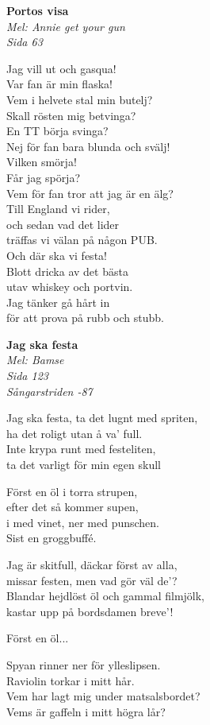 \documentclass[10pt]{article}
\newenvironment{song}[2]{
	\textbf{#1}\\
	\emph{#2}\par
	\vspace{-1mm}
}{
	\vspace{2mm}
}
\begin{document}
\begin{multicols*}{2}
\vfill
\columnbreak

\begin{song}{Portos visa}{Mel: Annie get your gun\\Sida 63}
	Jag vill ut och gasqua!\\
	Var fan är min flaska!\\
	Vem i helvete stal min butelj?\\
	Skall rösten mig betvinga?\\
	En TT börja svinga?\\
	Nej för fan bara blunda och svälj!\\
	Vilken smörja!\\
	Får jag spörja?\\
	Vem för fan tror att jag är en älg?\\
	Till England vi rider,\\
	och sedan vad det lider\\
	träffas vi välan på någon PUB.\\
	Och där ska vi festa!\\
	Blott dricka av det bästa\\
	utav whiskey och portvin.\\
	Jag tänker gå hårt in\\
	för att prova på rubb och stubb.
\end{song}

\begin{song}{Jag ska festa}{Mel: Bamse\\Sida 123\\Sångarstriden -87}
	Jag ska festa, ta det lugnt med spriten,\\
	ha det roligt utan å va' full.\\
	Inte krypa runt med festeliten,\\
	ta det varligt för min egen skull

	Först en öl i torra strupen,\\
	efter det så kommer supen,\\
	i med vinet, ner med punschen.\\
	Sist en groggbuffé.

	Jag är skitfull, däckar först av alla,\\
	missar festen, men vad gör väl de'?\\
	Blandar hejdlöst öl och gammal filmjölk,\\
	kastar upp på bordsdamen breve'!

	Först en öl...

	Spyan rinner ner för ylleslipsen.\\
	Raviolin torkar i mitt hår.\\
	Vem har lagt mig under matsalsbordet?\\
	Vems är gaffeln i mitt högra lår?


\end{song}
\end{multicols*}
\end{document}

